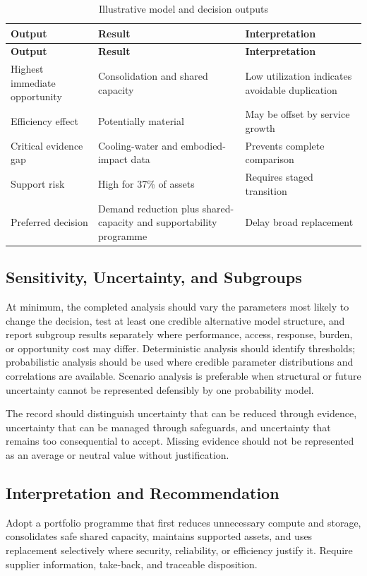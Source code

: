 \begin{longtable}{@{}p{}p{}p{}@{}}
\caption{Illustrative model and decision outputs}
\label{tab:comp-ch13-outputs}\\
\toprule
\textbf{Output} & \textbf{Result} & \textbf{Interpretation} \\
\midrule
\endfirsthead
\toprule
\textbf{Output} & \textbf{Result} & \textbf{Interpretation} \\
\midrule
\endhead
\bottomrule
\endlastfoot
Highest immediate opportunity & Consolidation and shared capacity & Low utilization indicates avoidable duplication \\
Efficiency effect & Potentially material & May be offset by service growth \\
Critical evidence gap & Cooling-water and embodied-impact data & Prevents complete comparison \\
Support risk & High for 37\% of assets & Requires staged transition \\
Preferred decision & Demand reduction plus shared-capacity and supportability programme & Delay broad replacement \\
\end{longtable}

\subsection{Sensitivity, Uncertainty, and Subgroups}
At minimum, the completed analysis should vary the parameters most likely to
change the decision, test at least one credible alternative model structure, and
report subgroup results separately where performance, access, response, burden,
or opportunity cost may differ. Deterministic analysis should identify thresholds;
probabilistic analysis should be used where credible parameter distributions and
correlations are available. Scenario analysis is preferable when structural or
future uncertainty cannot be represented defensibly by one probability model.

The record should distinguish uncertainty that can be reduced through evidence,
uncertainty that can be managed through safeguards, and uncertainty that remains
too consequential to accept. Missing evidence should not be represented as an
average or neutral value without justification.

\subsection{Interpretation and Recommendation}
Adopt a portfolio programme that first reduces unnecessary compute and storage, consolidates safe shared capacity, maintains supported assets, and uses replacement selectively where security, reliability, or efficiency justify it. Require supplier information, take-back, and traceable disposition.

